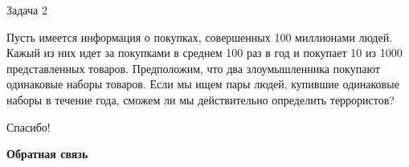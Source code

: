 \documentclass[10pt,a4paper]{beamer}
\begin{document}

\begin{frame}{Задача 2}

Пусть имеется информация о покупках, совершенных 100 миллионами людей. Кажый из них идет за покупками в среднем 100 раз в год и покупает 10 из 1000 представленных товаров. Предположим, что два злоумышленника покупают одинаковые наборы товаров. Если мы ищем пары людей, купившие одинаковые наборы в течение года, сможем ли мы действительно определить террористов?

\end{frame}


\begin{frame}{Спасибо!}

\begin{center}
{\Large \bf Обратная связь}
\end{center}

\end{frame}
\end{document}
